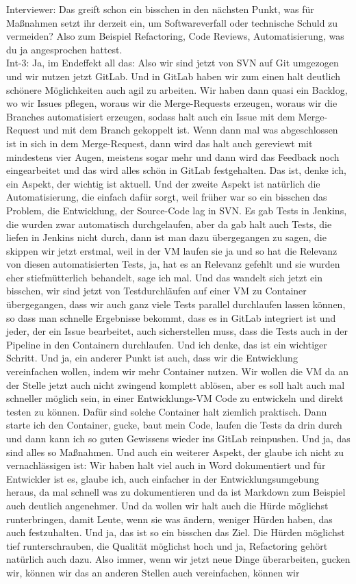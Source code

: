 Interviewer: Das greift schon ein bisschen in den nächsten Punkt, was für Maßnahmen setzt ihr derzeit ein, um Softwareverfall oder technische Schuld zu vermeiden? Also zum Beispiel Refactoring, Code Reviews, Automatisierung, was du ja angesprochen hattest.\\
Int-3: Ja, im Endeffekt all das: Also wir sind jetzt von SVN auf Git umgezogen und wir nutzen jetzt GitLab. Und in GitLab haben wir zum einen halt deutlich schönere Möglichkeiten auch agil zu arbeiten. Wir haben dann quasi ein Backlog, wo wir Issues pflegen, woraus wir die Merge-Requests erzeugen, woraus wir die Branches automatisiert erzeugen, sodass halt auch ein Issue mit dem Merge-Request und mit dem Branch gekoppelt ist. Wenn dann mal was abgeschlossen ist in sich in dem Merge-Request, dann wird das halt auch gereviewt mit mindestens vier Augen, meistens sogar mehr und dann wird das Feedback noch eingearbeitet und das wird alles schön in GitLab festgehalten. Das ist, denke ich, ein Aspekt, der wichtig ist aktuell. Und der zweite Aspekt ist natürlich die Automatisierung, die einfach dafür sorgt, weil früher war so ein bisschen das Problem, die Entwicklung, der Source-Code lag in SVN. Es gab Tests in Jenkins, die wurden zwar automatisch durchgelaufen, aber da gab halt auch Tests, die liefen in Jenkins nicht durch, dann ist man dazu übergegangen zu sagen, die skippen wir jetzt erstmal, weil in der VM laufen sie ja und so hat die Relevanz von diesen automatisierten Tests, ja, hat es an Relevanz gefehlt und sie wurden eher stiefmütterlich behandelt, sage ich mal. Und das wandelt sich jetzt ein bisschen, wir sind jetzt von Testdurchläufen auf einer VM zu Container übergegangen, dass wir auch ganz viele Tests parallel durchlaufen lassen können, so dass man schnelle Ergebnisse bekommt, dass es in GitLab integriert ist und jeder, der ein Issue bearbeitet, auch sicherstellen muss, dass die Tests auch in der Pipeline in den Containern durchlaufen. Und ich denke, das ist ein wichtiger Schritt. Und ja, ein anderer Punkt ist auch, dass wir die Entwicklung vereinfachen wollen, indem wir mehr Container nutzen. Wir wollen die VM da an der Stelle jetzt auch nicht zwingend komplett ablösen, aber es soll halt auch mal schneller möglich sein, in einer Entwicklungs-VM Code zu entwickeln und direkt testen zu können. Dafür sind solche Container halt ziemlich praktisch. Dann starte ich den Container, gucke, baut mein Code, laufen die Tests da drin durch und dann kann ich so guten Gewissens wieder ins GitLab reinpushen. Und ja, das sind alles so Maßnahmen. Und auch ein weiterer Aspekt, der glaube ich nicht zu vernachlässigen ist: Wir haben halt viel auch in Word dokumentiert und für Entwickler ist es, glaube ich, auch einfacher in der Entwicklungsumgebung heraus, da mal schnell was zu dokumentieren und da ist Markdown zum Beispiel auch deutlich angenehmer. Und da wollen wir halt auch die Hürde möglichst runterbringen, damit Leute, wenn sie was ändern, weniger Hürden haben, das auch festzuhalten. Und ja, das ist so ein bisschen das Ziel. Die Hürden möglichst tief runterschrauben, die Qualität möglichst hoch und ja, Refactoring gehört natürlich auch dazu. Also immer, wenn wir jetzt neue Dinge überarbeiten, gucken wir, können wir das an anderen Stellen auch vereinfachen, können wir 